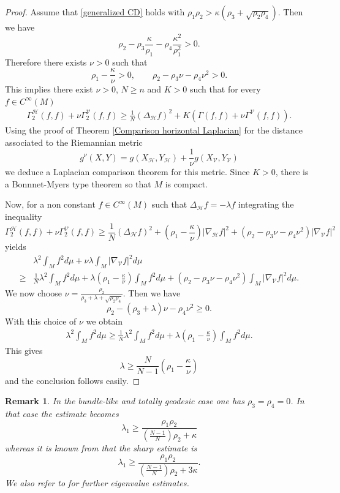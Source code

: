 \documentclass[11pt]{article}
\numberwithin{equation}{section}
\newtheorem{remark}[theorem]{Remark}
\newcommand{\Ho}{\mathcal H}
\newcommand{\V}{\mathcal V}
\begin{document}
    \begin{proof}
Assume that \eqref{generalized CD} holds with $\rho_1 \rho_2 > \kappa (\rho_3 +\sqrt{\rho_2\rho_4})$. Then we have
\[
\rho_2 -\rho_3 \frac{\kappa}{\rho_1}-\rho_4 \frac{\kappa^2}{\rho_1^2}>0.
\]
Therefore there exists $\nu >0$ such that
\[
\rho_1-\frac{\kappa}{\nu} >0, \qquad \rho_2-\rho_3 \nu -\rho_4 \nu^2 >0.
\]
This implies there exist $\nu>0$, $N \ge n$  and $K>0$ such that for every $f \in C^\infty (M)$ 
\begin{align*}
\Gamma^\Ho_2 (f,f)+ \nu \Gamma_2^\V (f,f) \ge \frac{1}{N}(\Delta_\Ho f)^2 +K ( \Gamma(f,f)+\nu \Gamma^\V (f,f)).
\end{align*}
Using the proof of Theorem \ref{Comparison horizontal Laplacian} for the distance associated to the Riemannian metric
\[
g^\nu(X,Y)=g(X_\Ho,Y_\Ho) +\frac{1}{\nu} g(X_\V,Y_\V)
\]
we deduce a Laplacian comparison theorem for this metric. Since $K>0$, there is a Bonnnet-Myers type theorem so that $M$ is compact.

Now, for a non constant $f \in C^\infty(M)$ such that $\Delta_\Ho f =-\lambda f$  integrating the inequality
\[
\Gamma^\Ho_2 (f,f)+ \nu \Gamma_2^\V (f,f) \ge \frac{1}{N}(\Delta_\Ho f)^2 +\left(\rho_1-\frac{\kappa}{\nu} \right) | \nabla_\Ho f|^2+ (\rho_2 -\rho_3 \nu -\rho_4 \nu^2) | \nabla_\V f|^2
\]
yields
\begin{align*}
 & \lambda^2 \int_M f^2 d\mu +\nu \lambda \int_M |\nabla_\V f|^2 d\mu \\
 \ge & \frac{1}{N} \lambda^2   \int_M f^2 d\mu+\lambda \left(\rho_1-\frac{\kappa}{\nu} \right) \int_M f^2 d\mu +(\rho_2 -\rho_3 \nu -\rho_4 \nu^2) \int_M | \nabla_\V f|^2 d\mu.
\end{align*}
We now choose $\nu =\frac{ \rho_2 }{\rho_3+\lambda+\sqrt{\rho_2\rho_4}}$. Then we have
\[
\rho_2 -(\rho_3+\lambda) \nu -\rho_4 \nu^2 \ge 0.
\]
With this choice of $\nu$ we obtain
\begin{align*}
  \lambda^2 \int_M f^2 d\mu  
 \ge  \frac{1}{N} \lambda^2   \int_M f^2 d\mu+\lambda \left(\rho_1-\frac{\kappa}{\nu} \right) \int_M f^2 d\mu .
\end{align*}
This gives
\[
\lambda \ge \frac{N}{N-1} \left(\rho_1-\frac{\kappa}{\nu} \right)
\]
and the conclusion follows easily.
    \end{proof}

\begin{remark}
    In the bundle-like and totally geodesic case one has $\rho_3=\rho_4=0$. In that case the estimate becomes
    \[
    \lambda_1 \ge \frac{\rho_1 \rho_2}{\left(\frac{N-1}{N}\right)\rho_2+\kappa }
    \]
    whereas it is known from \cite{BaudoinEMS2014} that the sharp estimate is
    \[
    \lambda_1 \ge \frac{\rho_1 \rho_2}{\left(\frac{N-1}{N}\right)\rho_2+3\kappa }.
    \]
    We also refer to \cite{BergeGrong2019} for further eigenvalue estimates.
\end{remark}
\end{document}
